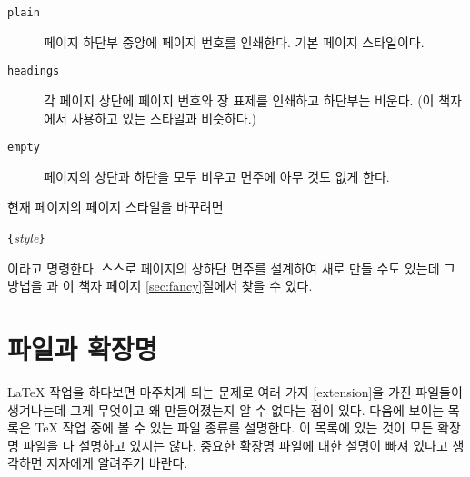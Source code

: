 \begin{table}[!hbp]
\caption{\LaTeX 의 페이지 스타일} \label{pagestyle}
\begin{lined}{\textwidth}
\begin{description}

\item[\normalfont\texttt{plain}] 
  페이지 하단부 중앙에 페이지 번호를 인쇄한다. 기본 페이지 스타일이다.

\item[\normalfont\texttt{headings}] 
  각 페이지 상단에 페이지 번호와 장 표제를 인쇄하고 하단부는 비운다. (이 책자에서 사용하고 있는 스타일과 비슷하다.)
 
\item[\normalfont\texttt{empty}] 
  페이지의 상단과 하단을 모두 비우고 면주에 아무 것도 없게 한다.

\end{description}
\end{lined}
\end{table}


현재 페이지의 페이지 스타일을 바꾸려면
\begin{lscommand}
\verb|{|\emph{style}\verb|}|
\end{lscommand}
\noindent 이라고 명령한다.
스스로 페이지의 상하단 면주를 설계하여 새로 만들 수도 있는데
그 방법을 \companion 과 이 책자 \pageref{sec:fancy}페이지 \ref{sec:fancy}절에서 찾을 수 있다.

\section{파일과 확장명}

\LaTeX{} 작업을 하다보면 마주치게 되는 문제로 여러 가지 [extension]을 가진 
파일들이 생겨나는데 그게 무엇이고 왜 만들어졌는지 알 수 없다는 점이 있다.
다음에 보이는 목록은 \TeX{} 작업 중에 볼 수 있는 파일 종류를 설명한다.
이 목록에 있는 것이 모든 확장명 파일을 다 설명하고 있지는 않다. 중요한 확장명 파일에 대한 설명이
빠져 있다고 생각하면 저자에게 알려주기 바란다.

